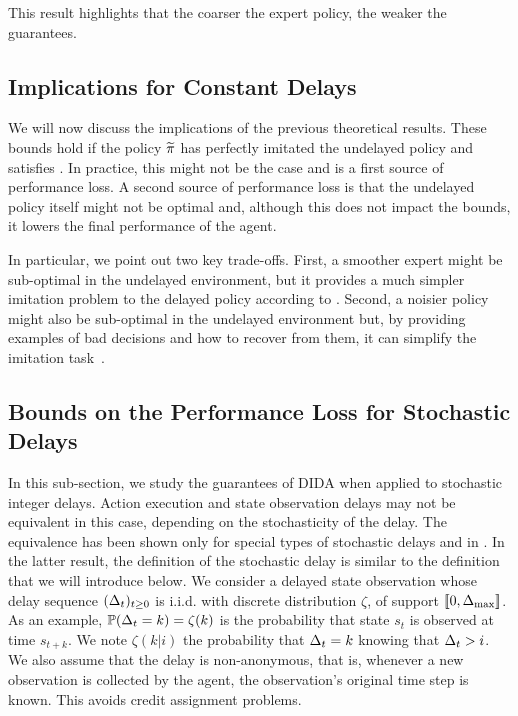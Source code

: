 This result highlights that the coarser the expert policy, the weaker the guarantees. 

\subsection{Implications for Constant Delays}
We will now discuss the implications of the previous theoretical results. 
These bounds hold if the policy ${\widetilde{\pi}}$ has perfectly imitated the undelayed policy and satisfies . 
In practice, this might not be the case and is a first source of performance loss.
A second source of performance loss is that the undelayed policy itself might not be optimal and, although this does not impact the bounds, it lowers the final performance of the agent.

In particular, we point out two key trade-offs. 
First, a smoother expert might be sub-optimal in the undelayed environment, but it provides a much simpler imitation problem to the delayed policy according to . 
Second, a noisier policy might also be sub-optimal in the undelayed environment but, by providing examples of bad decisions and how to recover from them, it can simplify the imitation task~\cite{laskey2017dart}.



\subsection{Bounds on the Performance Loss for Stochastic Delays}
\label{subsec:stoch_delay_dida}
In this sub-section, we study the guarantees of DIDA when applied to stochastic integer delays. 
Action execution and state observation delays may not be equivalent in this case, depending on the stochasticity of the delay.
The equivalence has been shown only for special types of stochastic delays \cite[Result~2]{katsikopoulos2003markov} and in \cite{bouteiller2020reinforcement}.
In the latter result, the definition of the stochastic delay is similar to the definition that we will introduce below.
We consider a delayed state observation whose delay sequence $(\Delta_t)_{t\ge0}$ is i.i.d. with discrete distribution $\zeta$, of support $[\![0,{\Delta_{\max}}]\!]$.
As an example, $\mathbb{P}(\Delta_t=k)= \zeta(k)$ is the probability that state $s_t$ is observed at time $s_{t+k}$. 
We note $\zeta(k\vert i)$ the probability that $\Delta_t=k$ knowing that $\Delta_t>i$.
We also assume that the delay is non-anonymous, that is, whenever a new observation is collected by the agent, the observation's original time step is known. 
This avoids credit assignment problems.

